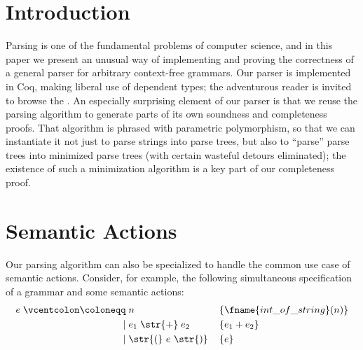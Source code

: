 \section{Introduction} \label{sec:intro}
  Parsing is one of the fundamental problems of computer science, and in this paper we present an unusual way of implementing and proving the correctness of a general parser for arbitrary context-free grammars.  Our parser is implemented in Coq, making liberal use of dependent types; the adventurous reader is invited to browse the
  \hyperref[sec:intro]{\hphantom{included source code}}%
  .  An especially surprising element of our parser is that we reuse the parsing algorithm to generate parts of its own soundness and completeness proofs.  That algorithm is phrased with parametric polymorphism, so that we can instantiate it not just to parse strings into parse trees, but also to ``parse'' parse trees into minimized parse trees (with certain wasteful detours eliminated); the existence of such a minimization algorithm is a key part of our completeness proof.

  




\section{Semantic Actions} \label{sec:semantic-actions}
  Our parsing algorithm can also be specialized to handle the common use case of semantic actions.  Consider, for example, the following simultaneous specification of a grammar and some semantic actions:
  \begin{align*}
    e \mathrel{\vcentcolon\coloneqq}{} & n && \left\{\fname{int\_of\_string}(n)\right\} \\
    \mathrel{|}{} & e_1\mathrel{\str{+}}e_2 && \left\{e_1 + e_2\right\} \\
    \mathrel{|}{} & \str{(}~e~\str{)} && \left\{e\right\}
  \end{align*}

